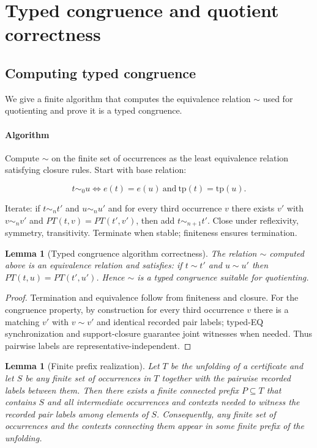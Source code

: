 \documentclass[11pt]{article}
\newcommand{\tp}{\mathrm{tp}}
\newtheorem{lemma}[theorem]{Lemma}
\begin{document}
\section{Typed congruence and quotient correctness}
\label{sec:typed-congruence}

\subsection{Computing typed congruence}
\label{subsec:typed-congruence-algo}

We give a finite algorithm that computes the equivalence relation $\sim$
used for quotienting and prove it is a typed congruence.

\paragraph{Algorithm}
Compute $\sim$ on the finite set of occurrences as the least equivalence
relation satisfying closure rules. Start with base relation:


\[
t\sim_0 u \iff e(t)=e(u)\ \text{and}\ \tp(t)=\tp(u).
\]


Iterate: if $t\sim_n t'$ and $u\sim_n u'$ and for every third occurrence $v$
there exists $v'$ with $v\sim_n v'$ and $PT(t,v)=PT(t',v')$, then add
$t\sim_{n+1} t'$. Close under reflexivity, symmetry, transitivity. Terminate
when stable; finiteness ensures termination.

\begin{lemma}[Typed congruence algorithm correctness]
\label{lem:typed-congruence-algo}
The relation $\sim$ computed above is an equivalence relation and satisfies:
if $t\sim t'$ and $u\sim u'$ then $PT(t,u)=PT(t',u')$. Hence $\sim$ is a typed
congruence suitable for quotienting.
\end{lemma}

\begin{proof}
Termination and equivalence follow from finiteness and closure. For the
congruence property, by construction for every third occurrence $v$ there is a
matching $v'$ with $v\sim v'$ and identical recorded pair labels; typed-EQ
synchronization and support-closure guarantee joint witnesses when needed.
Thus pairwise labels are representative-independent.
\end{proof}

\begin{lemma}[Finite prefix realization]
\label{lem:finite-prefix-realization}
Let $T$ be the unfolding of a certificate and let $S$ be any finite set of occurrences
in $T$ together with the pairwise recorded labels between them. Then there exists a finite
connected prefix $P\subseteq T$ that contains $S$ and all intermediate occurrences and
contexts needed to witness the recorded pair labels among elements of $S$. Consequently,
any finite set of occurrences and the contexts connecting them appear in some finite
prefix of the unfolding.
\end{lemma}
\end{document}

